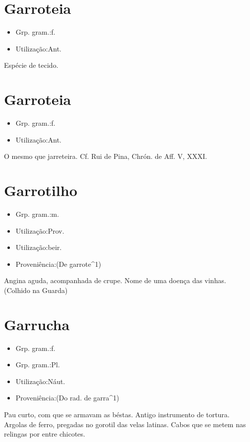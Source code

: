 \section{Garroteia}
\begin{itemize}
\item {Grp. gram.:f.}
\end{itemize}
\begin{itemize}
\item {Utilização:Ant.}
\end{itemize}
Espécie de tecido.
\section{Garroteia}
\begin{itemize}
\item {Grp. gram.:f.}
\end{itemize}
\begin{itemize}
\item {Utilização:Ant.}
\end{itemize}
O mesmo que \textunderscore jarreteira\textunderscore . Cf. Rui de Pina, \textunderscore Chrón. de Aff. V\textunderscore , XXXI.
\section{Garrotilho}
\begin{itemize}
\item {Grp. gram.:m.}
\end{itemize}
\begin{itemize}
\item {Utilização:Prov.}
\end{itemize}
\begin{itemize}
\item {Utilização:beir.}
\end{itemize}
\begin{itemize}
\item {Proveniência:(De \textunderscore garrote\textunderscore ^1)}
\end{itemize}
Angina aguda, acompanhada de crupe.
Nome de uma doença das vinhas. (Colhido na Guarda)
\section{Garrucha}
\begin{itemize}
\item {Grp. gram.:f.}
\end{itemize}
\begin{itemize}
\item {Grp. gram.:Pl.}
\end{itemize}
\begin{itemize}
\item {Utilização:Náut.}
\end{itemize}
\begin{itemize}
\item {Proveniência:(Do rad. de \textunderscore garra\textunderscore ^1)}
\end{itemize}
Pau curto, com que se armavam as béstas.
Antigo instrumento de tortura.
Argolas de ferro, pregadas no gorotil das velas latinas.
Cabos que se metem nas relingas por entre chicotes.
